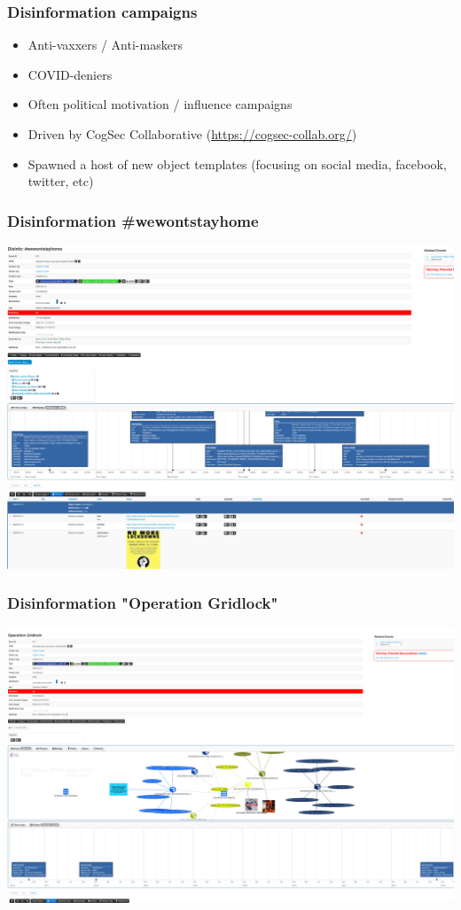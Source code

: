 \begin{frame}
 \frametitle{Disinformation campaigns}
 \begin{itemize}
         \item Anti-vaxxers / Anti-maskers
         \item COVID-deniers
         \item Often political motivation / influence campaigns
         \item Driven by CogSec Collaborative (\url{https://cogsec-collab.org/})
         \item Spawned a host of new object templates (focusing on social media, facebook, twitter, etc)
 \end{itemize}
\end{frame}

\begin{frame}
    \frametitle{Disinformation \#wewontstayhome}
    \includegraphics[width=1.00\linewidth]{wewontstayhome.png}
\end{frame}

\begin{frame}
    \frametitle{Disinformation "Operation Gridlock"}
    \includegraphics[width=1.00\linewidth]{operationgridlock.png}
\end{frame}

